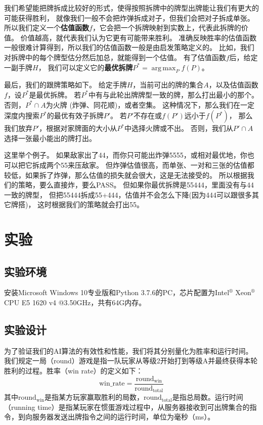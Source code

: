 \documentclass[a4paper]{ctexart}
\DeclareMathOperator*{\argmax}{arg\,max}
\begin{document}
\begin{enumerate}
\begin{enumerate}
    我们希望能把牌拆成比较好的形式，使得按照拆牌中的牌型出牌能让我们有更大的可能获得胜利，
    就像我们一般不会把炸弹拆成对子，但我们会把对子拆成单张。
    所以我们定义一个\textbf{估值函数}$f$，它会把一个拆牌映射到实数上，代表此拆牌的价值。
    价值越高，就代表我们认为它更有可能带来胜利。
    准确反映胜率的估值函数一般很难计算得到，所以我们的估值函数一般是由启发策略定义的。
    比如，我们对拆牌中的每个牌型估分然后加总，就能得到一个估值。
    有了估值函数$f$后，给定一副手牌$H$，
    我们可以定义它的\textbf{最优拆牌}$P^*=\argmax_{P} f(P)$。
    
    最后，我们的跟牌策略如下。
    给定手牌$H$，当前可出的牌的集合$A$，以及估值函数$f$，设$P^*$是最优拆牌。
    若$P^*$中有与此轮出牌牌型一致的牌，那么打出最小的那个。
    否则，$P^*\cap A$为火牌 (炸弹、同花顺)，或者空集。
    这种情况下，那么我们在一定深度内搜索$P^*$的最优有效子拆牌$P'$。
    若$P'$不存在或$f(P')$远小于$f(P^*)$，
    那么我们放弃$P'$，根据对家牌面的大小从$P^*$中选择火牌或不出。
    否则，我们从$P'\cap A$选择一张最小能出的牌打出。
    
    这里举个例子。
    如果敌家出了44，而你只可能出炸弹5555，或相对最优地，你也可以把它拆成两个55来压敌家。
    但炸弹估值很高，而单张、一对和三张的估值都较低，如果拆了炸弹，那么估值的损失就会很大，这是无法接受的。
    所以根据我们的策略，要么直接炸，要么PASS。
    但如果你最优拆牌是55444，里面没有与44一致的牌型，
    但把55444拆成55+444，估值并不会怎么下降(因为444可以跟很多其它牌搭)，
    这时根据我们的策略就会打出55。
    
  \end{enumerate}
\end{enumerate}

\section{实验} \label{sec:experiment}

\subsection{实验环境}

安装Microsoft Windows 10专业版和Python 3.7.6的PC，芯片配置为Intel$^\circledR$ Xeon$^\circledR$  CPU E5 1620 v4 @3.50GHz，共有64G内存。

\subsection{实验设计}

为了验证我们的AI算法的有效性和性能，我们将其分别量化为胜率和运行时间。我们规定一局（round）游戏是指一队玩家从等级2开始打到等级A并最终获得本轮胜利的过程。胜率（win rate）的定义如下：\[\mathrm{win\_rate} = \frac{\mathrm{round}_{\mathrm{win}}}{\mathrm{round}_{\mathrm{total}}}\]其中$\mathrm{round}_{\mathrm{win}}$是指某方玩家赢取胜利的局数，$\mathrm{round}_{\mathrm{total}}$是指总局数。运行时间（running time）是指某玩家在惯蛋游戏过程中，从服务器接收到可出牌集合的指令，到向服务器发送出牌指令之间的运行时间，单位为毫秒（ms）。
\end{document}
